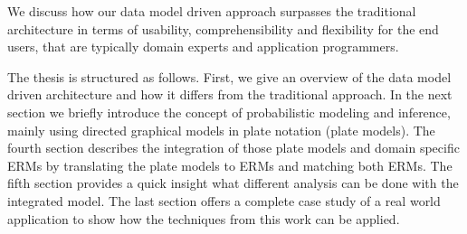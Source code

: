 We discuss how our data model driven approach surpasses the traditional architecture in terms of usability, comprehensibility and flexibility for the end users, that are typically domain experts and application programmers.

The thesis is structured as follows. First, we give an overview of the data model driven architecture and how it differs from the traditional approach. In the next section we briefly introduce the concept of probabilistic modeling and inference, mainly using directed graphical models in plate notation (plate models). The fourth section describes the integration of those plate models and domain specific ERMs by translating the plate models to ERMs and matching both ERMs. The fifth section provides a quick insight what different analysis can be done with the integrated model. The last section offers a complete case study of a real world application to show how the techniques from this work can be applied.
